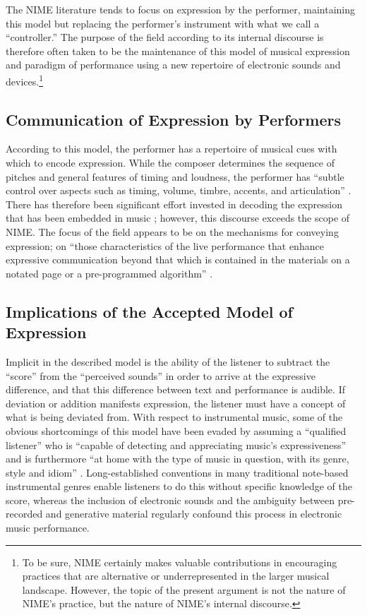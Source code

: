 The NIME literature tends to focus on expression by the performer, maintaining this model but replacing the performer's instrument with what we call a ``controller.'' The purpose of the field according to its internal discourse is therefore often taken to be the maintenance of this model of musical expression and paradigm of performance using a new repertoire of electronic sounds and devices.\footnote{To be sure, NIME certainly makes valuable contributions in encouraging practices that are alternative or underrepresented in the larger musical landscape. However, the topic of the present argument is not the nature of NIME's practice, but the nature of NIME's internal discourse.}

\subsection{Communication of Expression by Performers}
\label{Gurevich:sub:2_1}
According to this model, the performer has a repertoire of musical cues with which to encode expression. While the composer determines the sequence of pitches and general features of timing and loudness, the performer has ``subtle control over aspects such as timing, volume, timbre, accents, and articulation'' \cite{Marrin:2000}. There has therefore been significant effort invested in decoding the expression that has been embedded in music \cite{Cooke:1959}; however, this discourse exceeds the scope of NIME. The focus of the field appears to be on the mechanisms for conveying expression; on ``those characteristics of the live performance that enhance expressive communication beyond that which is contained in the materials on a notated page or a pre-programmed algorithm'' \cite{Dobrian:2006}.

\subsection{Implications of the Accepted Model of Expression}
\label{Gurevich:sub:2_2}
Implicit in the described model is the ability of the listener to subtract the ``score'' from the ``perceived sounds'' in order to arrive at the expressive difference, and that this difference between text and performance is audible. If deviation or addition manifests expression, the listener must have a concept of what is being deviated from. With respect to instrumental music, some of the obvious shortcomings of this model have been evaded by assuming a ``qualified listener'' who is ``capable of detecting and appreciating music's expressiveness'' and is furthermore ``at home with the type of music in question, with its genre, style and idiom'' \cite{Davies:2001}. Long-established conventions in many traditional note-based instrumental genres enable listeners to do this without specific knowledge of the score, whereas the inclusion of electronic sounds and the ambiguity between pre-recorded and generative material regularly confound this process in electronic music performance.

